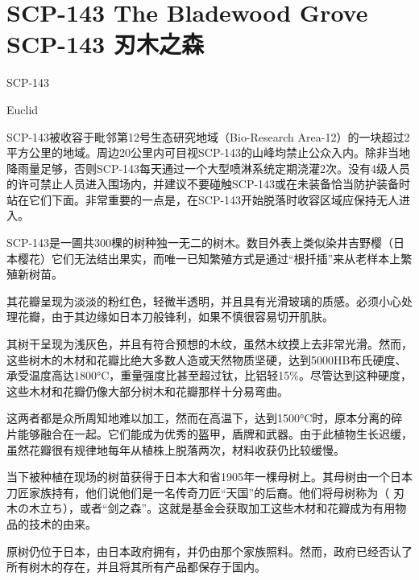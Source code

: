 \chapter[SCP-143 刃木之森]{
    SCP-143 The Bladewood Grove\\
    SCP-143 刃木之森
}

\label{chap:SCP-143}

SCP-143

Euclid

SCP-143被收容于毗邻第12号生态研究地域（Bio-Research Area-12）的一块超过2平方公里的地域。周边20公里内可目视SCP-143的山峰均禁止公众入内。除非当地降雨量足够，否则SCP-143每天通过一个大型喷淋系统定期浇灌2次。没有4级人员的许可禁止人员进入围场内，并建议不要碰触SCP-143或在未装备恰当防护装备时站在它们下面。非常重要的一点是，在SCP-143开始脱落时收容区域应保持无人进入。

SCP-143是一圃共300棵的树种独一无二的树木。数目外表上类似染井吉野樱（日本樱花）它们无法结出果实，而唯一已知繁殖方式是通过“根扦插”来从老样本上繁殖新树苗。

其花瓣呈现为淡淡的粉红色，轻微半透明，并且具有光滑玻璃的质感。必须小心处理花瓣，由于其边缘如日本刀般锋利，如果不慎很容易切开肌肤。

其树干呈现为浅灰色，并且有符合预想的木纹，虽然木纹摸上去非常光滑。然而，这些树木的木材和花瓣比绝大多数人造或天然物质坚硬，达到5000HB布氏硬度、承受温度高达1800°C，重量强度比甚至超过钛，比铝轻15\%。尽管达到这种硬度，这些木材和花瓣仍像大部分树木和花瓣那样十分易弯曲。

这两者都是众所周知地难以加工，然而在高温下，达到1500°C时，原本分离的碎片能够融合在一起。它们能成为优秀的盔甲，盾牌和武器。由于此植物生长迟缓，虽然花瓣很有规律地每年从植株上脱落两次，材料收获仍比较缓慢。

当下被种植在现场的树苗获得于日本大和省1905年一棵母树上。其母树由一个日本刀匠家族持有，他们说他们是一名传奇刀匠“天国”的后裔。他们将母树称为（ 刃木の木立ち），或者“剑之森”。这就是基金会获取加工这些木材和花瓣成为有用物品的技术的由来。

原树仍位于日本，由日本政府拥有，并仍由那个家族照料。然而，政府已经否认了所有树木的存在，并且将其所有产品都保存于国内。

